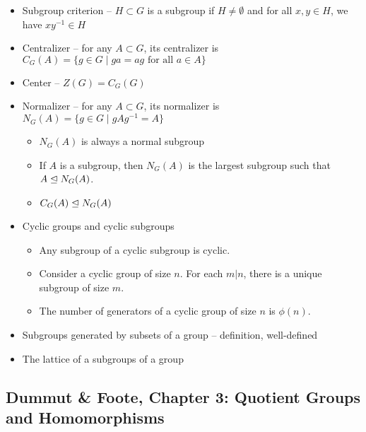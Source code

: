 \begin{itemize}
\item Subgroup criterion -- $H \subset G$ is a subgroup if $H \neq \emptyset$ and for all $x,y \in H$, we have $x y^{-1} \in H$
\item Centralizer -- for any $A \subset G$, its centralizer is $C_G(A) = \{ g \in G \;|\; g a = a g \textrm{ for all } a \in A \}$
\item Center -- $Z(G) = C_G(G)$
\item Normalizer -- for any $A \subset G$, its normalizer is $N_G(A) = \{ g \in G \;|\; g A g^{-1} = A \}$
  \begin{itemize}
  \item $N_G(A)$ is always a normal subgroup
  \item If $A$ is a subgroup, then $N_G(A)$ is the largest subgroup such that $A \trianglelefteq N_G(A)$.
  \item $C_G(A) \trianglelefteq N_G(A)$
  \end{itemize}
\item Cyclic groups and cyclic subgroups
  \begin{itemize}
  \item Any subgroup of a cyclic subgroup is cyclic.
  \item Consider a cyclic group of size $n$. For each $m|n$, there is a unique subgroup of size $m$.
  \item The number of generators of a cyclic group of size $n$ is $\phi(n)$.
  \end{itemize}
\item Subgroups generated by subsets of a group -- definition, well-defined
\item The lattice of a subgroups of a group
\end{itemize}

\subsection{Dummut \& Foote, Chapter 3: Quotient Groups and Homomorphisms}

